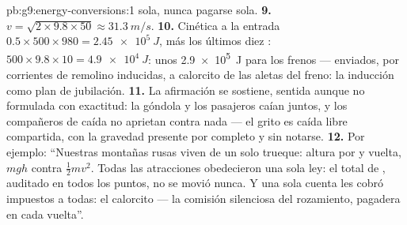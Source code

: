 \begin{solution}{pb:g9:energy-conversions:1}
sola, nunca pagarse sola.
\textbf{9.} $v = \sqrt{2 \times 9.8 \times 50} \approx
\qty{31.3}{m/s}$.
\textbf{10.} Cinética a la entrada $0.5 \times 500 \times 980 =
\qty{2.45e5}{J}$, más los últimos diez : $500 \times 9.8
\times 10 = \qty{4.9e4}{J}$: unos \qty{2.9e5}{J} para los frenos ---
enviados, por corrientes de remolino inducidas, a calorcito de las
aletas del freno: la inducción como plan de jubilación.
\textbf{11.} La afirmación se sostiene, sentida aunque no formulada con
exactitud: la góndola y los pasajeros caían juntos, y los compañeros de
caída no aprietan contra nada --- el grito es caída libre compartida,
con la gravedad presente por completo y sin notarse.
\textbf{12.} Por ejemplo: ``Nuestras montañas rusas viven de un solo
trueque: altura por  y vuelta, $m g h$ contra $\frac12 m
v^2$. Todas las atracciones obedecieron una sola ley: el total de
, auditado en todos los puntos, no se movió nunca. Y una sola
cuenta les cobró impuestos a todas: el calorcito --- la comisión
silenciosa del rozamiento, pagadera en cada vuelta''.
\end{solution}
